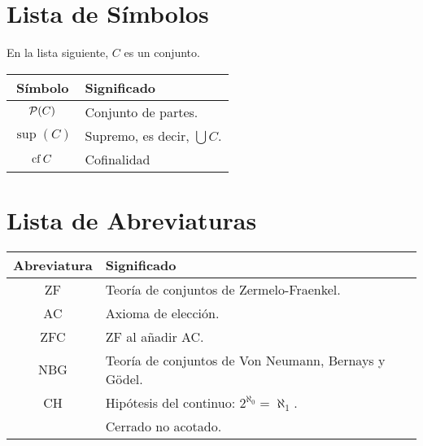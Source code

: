 \chapter*{Lista de Símbolos}

En la lista siguiente, $C$ es un conjunto.

\begin{center}
    \begin{tabular}{cl}
        Símbolo & Significado \\
        \hline\noalign{\smallskip}
        $\mathcal{P}(C)$ & Conjunto de partes.\\
        $\sup(C)$ & Supremo, es decir, $\bigcup C$.\\
        $\operatorname*{cf} C$ & Cofinalidad
    \end{tabular}
\end{center}

\newpage
\chapter*{Lista de Abreviaturas}

\begin{center}
    \begin{tabular}{cl}
        Abreviatura & Significado \\
        \hline\noalign{\smallskip}
        ZF & Teoría de conjuntos de Zermelo-Fraenkel.\\
        AC & Axioma de elección.\\
        ZFC & ZF al añadir AC.\\
        NBG & Teoría de conjuntos de Von Neumann, Bernays y Gödel.\\
        CH & Hipótesis del continuo: $2^{\aleph_0} = \aleph_1$. \\
        \cna{} & Cerrado no acotado. \\
    \end{tabular}
\end{center}
\fi
\iftoc \ToC \fi
\ifintro
